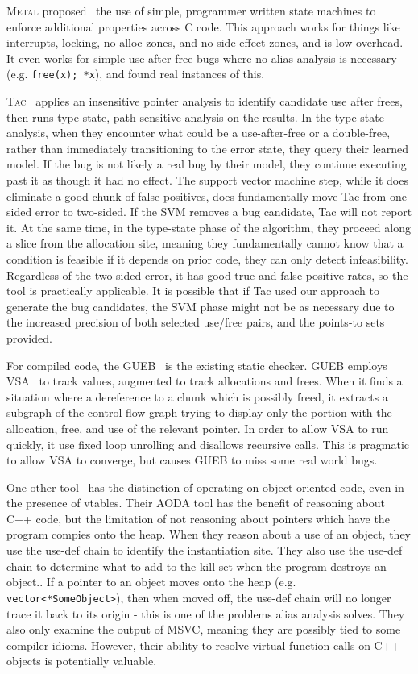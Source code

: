\textsc{Metal} proposed~\cite{metal} the use of simple, programmer written state machines to enforce additional properties across C code.
This approach works for things like interrupts, locking, no-alloc zones, and no-side effect zones, and is low overhead.
It even works for simple use-after-free bugs where no alias analysis is necessary (e.g. \texttt{free(x); *x}), and found real instances of this.

\textsc{Tac}~\cite{tac} applies an insensitive pointer analysis to identify candidate use after frees, then runs type-state, path-sensitive analysis on the results.
In the type-state analysis, when they encounter what could be a use-after-free or a double-free, rather than immediately transitioning to the error state, they query their learned model.
If the bug is not likely a real bug by their model, they continue executing past it as though it had no effect.
The support vector machine step, while it does eliminate a good chunk of false positives, does fundamentally move Tac from one-sided error to two-sided.
If the SVM removes a bug candidate, Tac will not report it.
At the same time, in the type-state phase of the algorithm, they proceed along a slice from the allocation site, meaning they fundamentally cannot know that a condition is feasible if it depends on prior code, they can only detect infeasibility.
Regardless of the two-sided error, it has good true and false positive rates, so the tool is practically applicable.
It is possible that if Tac used our approach to generate the bug candidates, the SVM phase might not be as necessary due to the increased precision of both selected use/free pairs, and the points-to sets provided.

For compiled code, the GUEB~\cite{gueb} is the existing static checker.
GUEB employs VSA~\cite{vsa} to track values, augmented to track allocations and frees.
When it finds a situation where a dereference to a chunk which is possibly freed, it extracts a subgraph of the control flow graph trying to display only the portion with the allocation, free, and use of the relevant pointer.
In order to allow VSA to run quickly, it use fixed loop unrolling and disallows recursive calls.
This is pragmatic to allow VSA to converge, but causes GUEB to miss some real world bugs.

One other tool~\cite{dewey-uncovering-2015} has the distinction of operating on object-oriented code, even in the presence of vtables.
Their AODA tool has the benefit of reasoning about C++ code, but the limitation of not reasoning about pointers which have the program compies onto the heap.
When they reason about a use of an object, they use the use-def chain to identify the instantiation site.
They also use the use-def chain to determine what to add to the kill-set when the program destroys an object..
If a pointer to an object moves onto the heap (e.g. \texttt{vector<*SomeObject>}), then when moved off, the use-def chain will no longer trace it back to its origin - this is one of the problems alias analysis solves.
They also only examine the output of MSVC, meaning they are possibly tied to some compiler idioms.
However, their ability to resolve virtual function calls on C++ objects is potentially valuable.

